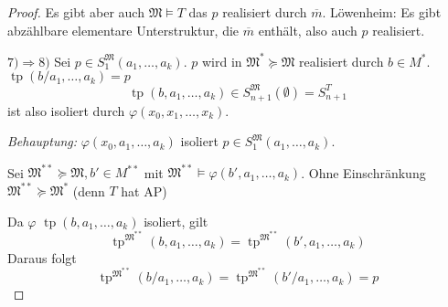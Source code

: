 \documentclass[12pt,parskip=full]{scrartcl}
\newcommand{\heading}{\underline}
\theoremstyle{definition}
\begin{document}
\begin{proof}
		Es gibt aber auch $\mathfrak{M} \models T$ das $p$ realisiert durch $\overline{m}$. Löwenheim: Es gibt abzählbare elementare Unterstruktur, die $\overline{m}$ enthält, also auch $p$ realisiert.
		
		\heading{$7) \Rightarrow 8)$} Sei $p \in S_1^\mathfrak{M}(a_1, \dots, a_k)$. $p$ wird in $\mathfrak{M}^* \succcurlyeq \mathfrak{M}$ realisiert durch $b \in M^*$. $\operatorname{tp}(b/a_1, \dots, a_k) = p$
		\begin{equation*}
			\operatorname{tp}(b, a_1, \dots, a_k) \in S_{n+1}^\mathfrak{M}(\emptyset) = S_{n+1}^T
		\end{equation*}
		ist also isoliert durch $\varphi(x_0, x_1, \dots, x_k)$.
		
		\textit{Behauptung:} $\varphi(x_0, a_1, \dots, a_k)$ isoliert $p \in S_1^\mathfrak{M}(a_1, \dots, a_k)$.
		
		Sei $\mathfrak{M}^{**} \succcurlyeq \mathfrak{M}, b' \in M^{**}$ mit $\mathfrak{M}^{**} \models \varphi(b', a_1, \dots, a_k)$. Ohne Einschränkung $\mathfrak{M}^{**} \succcurlyeq \mathfrak{M}^*$ (denn $T$ hat AP)
		
		Da $\varphi$ $\operatorname{tp}(b, a_1, \dots, a_k)$ isoliert, gilt
		\begin{equation*}
			\operatorname{tp}^{\mathfrak{M}^{**}}(b, a_1, \dots, a_k) = \operatorname{tp}^{\mathfrak{M}^{**}}(b', a_1, \dots, a_k)
		\end{equation*}
		Daraus folgt
		\begin{equation*}
			\operatorname{tp}^{\mathfrak{M}^{**}}(b / a_1, \dots, a_k) = \operatorname{tp}^{\mathfrak{M}^{**}}(b'/ a_1, \dots, a_k) = p
		\end{equation*}
		
	\end{proof}
\end{document}
